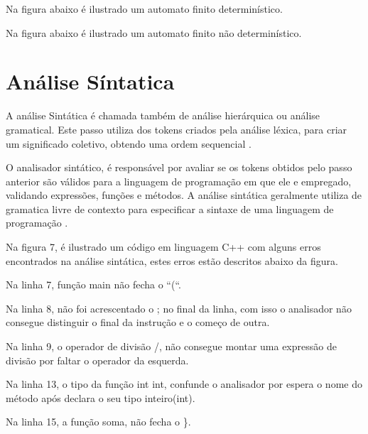 \documentclass[12pt,oneside,a4paper,chapter=TITLE,section=TITLE,sumario=tradicional]{abntex2}
\begin{document}
Na figura abaixo é ilustrado um automato finito determinístico.

\begin{figure}[H]
\end{figure}

Na figura abaixo é ilustrado um automato finito não determinístico.

\begin{figure}[H]
\end{figure}

\section{Análise Síntatica}
\label{sec:analise-sintatica}

A análise Sintática é chamada também de análise hierárquica ou análise gramatical. Este passo utiliza dos tokens criados pela análise léxica, para criar um significado coletivo, obtendo uma ordem sequencial \cite{alfred1995}.

O analisador sintático, é responsável por avaliar se os tokens obtidos pelo passo anterior são válidos para a linguagem de programação em que ele e empregado, validando expressões, funções e métodos. A análise sintática geralmente utiliza de gramatica livre de contexto para especificar a sintaxe de uma linguagem de programação \cite{maragon2015}.

Na figura 7, é ilustrado um código em linguagem C++ com alguns erros encontrados na análise sintática, estes erros estão descritos abaixo da figura.

\begin{figure}[htb]
\end{figure}

\begin{lista}
	\item Na linha 7, função main não fecha o “(“.
	\item Na linha 8, não foi acrescentado o ; no final da linha, com isso o analisador não consegue distinguir o final da instrução e o começo de outra.
	\item Na linha 9, o operador de divisão /, não consegue montar uma expressão de divisão por faltar o operador da esquerda. 
	\item Na linha 13, o tipo da função int int, confunde o analisador por espera o nome do método após declara o seu tipo inteiro(int).
	\item Na linha 15, a função soma, não fecha o \}.
\end{lista}
\end{document}
